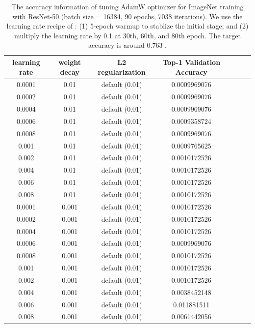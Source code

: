 \begin{table}[ht]
\renewcommand{\arraystretch}{1.3}
\caption{The accuracy information of tuning AdamW optimizer for ImageNet training with ResNet-50 (batch size = 16384, 90 epochs, 7038 iterations). We use the learning rate recipe of \citep{goyal2017accurate}: (1) 5-epoch warmup to stablize the initial stage; and (2) multiply the learning rate by 0.1 at 30th, 60th, and 80th epoch. The target accuracy is around 0.763 \citep{goyal2017accurate}.}
\centering
\begin{tabular}{|c|c|c|c|c|c|c|}
\hline
learning rate & weight decay & L2 regularization & Top-1 Validation Accuracy\\
\hline
\hline
0.0001 & 0.01 & default (0.01) & 0.0009969076\\
\hline
0.0002 & 0.01 & default (0.01) & 0.0009969076\\
\hline
0.0004 & 0.01 & default (0.01) & 0.0009969076\\
\hline
0.0006 & 0.01 & default (0.01) & 0.0009358724\\
\hline
0.0008 & 0.01 & default (0.01) & 0.0009969076\\
\hline
0.001 & 0.01 & default (0.01) & 0.0009765625\\
\hline
0.002 & 0.01 & default (0.01) & 0.0010172526\\
\hline
0.004 & 0.01 & default (0.01) & 0.0010172526\\
\hline
0.006 & 0.01 & default (0.01) & 0.0010172526\\
\hline
0.008 & 0.01 & default (0.01) & 0.0010172526\\
\hline
0.0001 & 0.001 & default (0.01) & 0.0010172526\\
\hline
0.0002 & 0.001 & default (0.01) & 0.0010172526\\
\hline
0.0004 & 0.001 & default (0.01) & 0.0010172526\\
\hline
0.0006 & 0.001 & default (0.01) & 0.0009969076\\
\hline
0.0008 & 0.001 & default (0.01) & 0.0010172526\\
\hline
0.001 & 0.001 & default (0.01) & 0.0010172526\\
\hline
0.002 & 0.001 & default (0.01) & 0.0010172526\\
\hline
0.004 & 0.001 & default (0.01) & 0.0038452148\\
\hline
0.006 & 0.001 & default (0.01) & 0.011881511\\
\hline
0.008 & 0.001 & default (0.01) & 0.0061442056\\
\hline
\end{tabular}
\label{table:imagenet_adam_tuning_l2_1}
\end{table}


